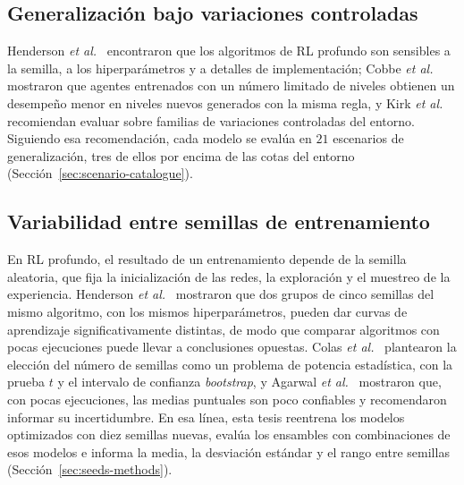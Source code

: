 \documentclass[../00_Main/Main.tex]{subfiles}
\begin{document}
\subsection{Generalizaci\'on bajo variaciones controladas}

Henderson \emph{et al.}~\citep{Henderson2018} encontraron que los
algoritmos de RL profundo son sensibles a la semilla, a los
hiperpar\'ametros y a detalles de implementaci\'on; Cobbe
\emph{et al.}~\citep{Cobbe2020} mostraron que agentes entrenados con un n\'umero limitado
de niveles obtienen un desempe\~no menor en niveles nuevos
generados con la misma regla, y Kirk
\emph{et al.}~\citep{Kirk2023} recomiendan evaluar sobre familias de
variaciones controladas del entorno. Siguiendo esa recomendaci\'on, cada
modelo se eval\'ua en $21$ escenarios de generalizaci\'on, tres de
ellos por encima de las cotas del entorno
(Secci\'on~\ref{sec:scenario-catalogue}).

\subsection{Variabilidad entre semillas de entrenamiento}\label{sec:soa-seeds}

En RL profundo, el resultado de un entrenamiento depende de la semilla
aleatoria, que fija la inicializaci\'on de las redes, la exploraci\'on y
el muestreo de la experiencia. Henderson \emph{et al.}~\citep{Henderson2018}
mostraron que dos grupos de cinco semillas del mismo algoritmo, con los
mismos hiperpar\'ametros, pueden dar curvas de aprendizaje
significativamente distintas, de modo que comparar algoritmos con pocas
ejecuciones puede llevar a conclusiones opuestas. Colas
\emph{et al.}~\citep{Colas2018} plantearon la elecci\'on del n\'umero de
semillas como un problema de potencia estad\'istica, con la prueba $t$ y
el intervalo de confianza \emph{bootstrap}, y Agarwal
\emph{et al.}~\citep{Agarwal2021} mostraron que, con pocas ejecuciones,
las medias puntuales son poco confiables y recomendaron informar su
incertidumbre. En esa l\'inea, esta tesis reentrena los modelos
optimizados con diez semillas nuevas, eval\'ua los ensambles con
combinaciones de esos modelos e informa la media, la desviaci\'on
est\'andar y el rango entre semillas (Secci\'on~\ref{sec:seeds-methods}).

\biblio %
\end{document}

